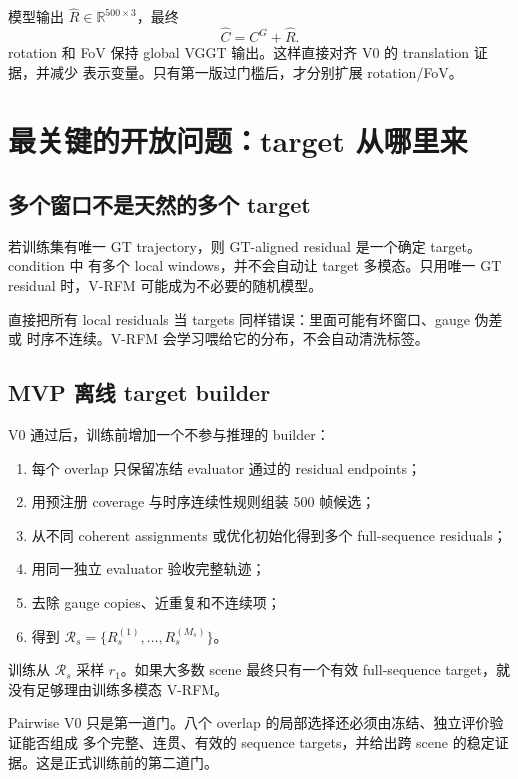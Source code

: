\documentclass[UTF8,a4paper,11pt]{ctexart}
\begin{document}
模型输出 $\widehat R\in\mathbb R^{500\times3}$，最终
\begin{equation}
  \widehat C=C^G+\widehat R.
\end{equation}
rotation 和 FoV 保持 global VGGT 输出。这样直接对齐 V0 的 translation 证据，并减少
表示变量。只有第一版过门槛后，才分别扩展 rotation/FoV。

\section{最关键的开放问题：target 从哪里来}

\subsection{多个窗口不是天然的多个 target}

若训练集有唯一 GT trajectory，则 GT-aligned residual 是一个确定 target。condition 中
有多个 local windows，并不会自动让 target 多模态。只用唯一 GT residual 时，V-RFM
可能成为不必要的随机模型。

直接把所有 local residuals 当 targets 同样错误：里面可能有坏窗口、gauge 伪差或
时序不连续。V-RFM 会学习喂给它的分布，不会自动清洗标签。

\subsection{MVP 离线 target builder}

V0 通过后，训练前增加一个不参与推理的 builder：
\begin{enumerate}
  \item 每个 overlap 只保留冻结 evaluator 通过的 residual endpoints；
  \item 用预注册 coverage 与时序连续性规则组装 500 帧候选；
  \item 从不同 coherent assignments 或优化初始化得到多个 full-sequence residuals；
  \item 用同一独立 evaluator 验收完整轨迹；
  \item 去除 gauge copies、近重复和不连续项；
  \item 得到 $\mathcal R_s=\{R_s^{(1)},\ldots,R_s^{(M_s)}\}$。
\end{enumerate}

训练从 $\mathcal R_s$ 采样 $r_1$。如果大多数 scene 最终只有一个有效 full-sequence
target，就没有足够理由训练多模态 V-RFM。

\begin{keybox}
Pairwise V0 只是第一道门。八个 overlap 的局部选择还必须由冻结、独立评价验证能否组成
多个完整、连贯、有效的 sequence targets，并给出跨 scene 的稳定证据。这是正式训练前的第二道门。
\end{keybox}
\end{document}
